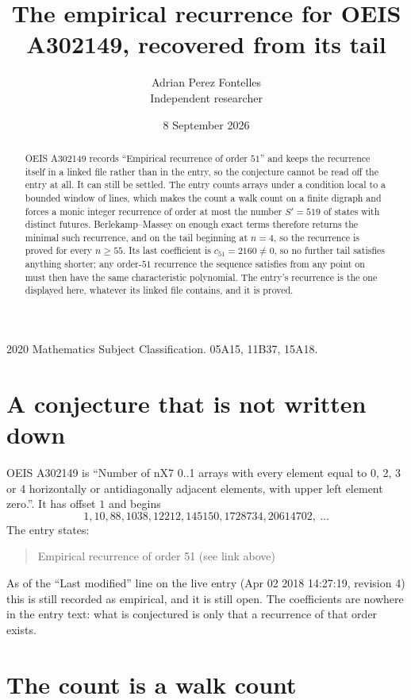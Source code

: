 \documentclass[11pt,a4paper]{article}
\title{The empirical recurrence for OEIS A302149, recovered from its tail}
\author{Adrian Perez Fontelles\\ \small Independent researcher}
\date{8 September 2026}
\theoremstyle{plain}
\theoremstyle{definition}
\begin{document}
\maketitle

\begin{abstract}
OEIS A302149 records ``Empirical recurrence of order $51$'' and keeps the recurrence itself in
a linked file rather than in the entry, so the conjecture cannot be read off the entry at all.
It can still be settled. The entry counts arrays under a condition local to a bounded window of
lines, which makes the count a walk count on a finite digraph and forces a monic integer
recurrence of order at most the number $S'=519$ of states with distinct futures. Berlekamp--Massey on
enough exact terms therefore returns the minimal such recurrence, and on the tail beginning at $n=4$, so the recurrence is proved for every $n\ge55$.
Its last coefficient is $c_{51}=2160\neq0$, so no further tail satisfies anything
shorter; any order-$51$ recurrence the sequence satisfies from any point on must then have
the same characteristic polynomial. The entry's recurrence is the one displayed here, whatever
its linked file contains, and it is proved.
\end{abstract}

\noindent\small 2020 Mathematics Subject Classification. 05A15, 11B37, 15A18.\normalsize

\section{A conjecture that is not written down}

OEIS A302149 is ``Number of nX7 0..1 arrays with every element equal to 0, 2, 3 or 4 horizontally or antidiagonally adjacent elements, with upper left element zero.''. It has offset $1$ and begins
\[
1, 10, 88, 1038, 12212, 145150, 1728734, 20614702,\ \dots
\]
The entry states:
\begin{quote}
Empirical recurrence of order 51 (see link above)
\end{quote}
As of the ``Last modified'' line on the live entry (Apr 02 2018 14:27:19, revision 4)
this is still recorded as empirical, and it is still open. The coefficients are nowhere in the
entry text: what is conjectured is only that a recurrence of that order exists.

\section{The count is a walk count}
\end{document}
